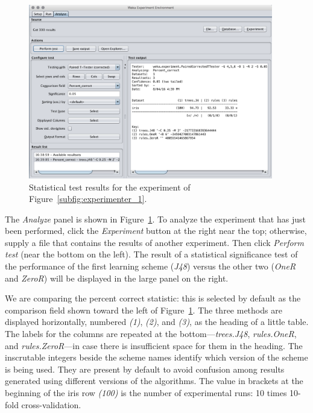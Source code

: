 \begin{figure}[!th]
\centering
\includegraphics[width=0.95\textwidth]{images/B4_2.png}
\caption{Statistical test results for the experiment of Figure~\ref{subfig:experimenter_1}.}
\label{fig:experimenter_analyze}
\end{figure}

The \textit{Analyze} panel is shown in
Figure~\ref{fig:experimenter_analyze}. To analyze the experiment that
has just been performed, click the \textit{Experiment} button at the
right near the top; otherwise, supply a file that contains the results
of another experiment. Then click \textit{Perform test} (near the
bottom on the left). The result of a statistical significance test of
the performance of the first learning scheme (\textit{J48}) versus the
other two (\textit{OneR} and \textit{ZeroR}) will be displayed in the
large panel on the right.

We are comparing the percent correct statistic: this is selected by
default as the comparison field shown toward the left of
Figure~\ref{fig:experimenter_analyze}. The three methods are displayed
horizontally, numbered \textit{(1)}, \textit{(2)}, and \textit{(3)},
as the heading of a little table. The labels for the columns are
repeated at the bottom---\textit{trees.J48}, \textit{rules.OneR}, and
\textit{rules.ZeroR}---in case there is insufficient space for them in
the heading. The inscrutable integers beside the scheme names identify
which version of the scheme is being used. They are present by default
to avoid confusion among results generated using different versions of
the algorithms. The value in brackets at the beginning of the iris row
\textit{(100)} is the number of experimental runs: 10 times 10-fold
cross-validation.

